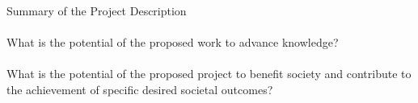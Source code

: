 \\
\noindent Summary of the Project Description\\

\\
\noindent What is the potential of the proposed work to advance knowledge?\\ 

\\
\noindent What is the potential of the proposed project to benefit society and contribute to the achievement of specific desired societal outcomes?

